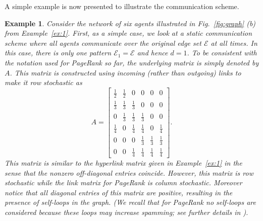 \documentclass[11pt,draftcls,onecolumn]{IEEEtran}
\newtheorem{example}[theorem]{Example}
\begin{document}
\vspace{.5cm}

A simple example is now presented to illustrate the communication scheme. 

\begin{example}\label{ex:consensus}\rm
Consider the network of six agents illustrated in Fig.~\ref{fig:graph} (b) from Example~\ref{ex:1}. 
First, as a simple case, we look at a static communication scheme
where all agents communicate over the original edge set $\mathcal{E}$ at all times.
In this case, there is only one pattern $\mathcal{E}_1 = \mathcal{E}$ and hence $d=1$. 
To be consistent with the notation used for PageRank so far, 
the underlying matrix is simply denoted by $A$. This matrix is constructed 
using incoming (rather than outgoing) links to make it row stochastic as
\[
 A = \begin{bmatrix}
       \frac{1}{2} & \frac{1}{2} & 0           & 0           & 0           & 0           \\
       \frac{1}{3} & \frac{1}{3} & \frac{1}{3} & 0           & 0           & 0           \\
       0           & \frac{1}{3} & \frac{1}{3} & \frac{1}{3} & 0           & 0           \\
       \frac{1}{4} & 0           & \frac{1}{4} & \frac{1}{4} & 0           & \frac{1}{4} \\
       0           & 0           & 0           & \frac{1}{3} & \frac{1}{3} & \frac{1}{3} \\
       0           & 0           & \frac{1}{4} & \frac{1}{4} & \frac{1}{4} & \frac{1}{4} 
     \end{bmatrix}.
\]
This matrix is similar to the hyperlink matrix given in Example~\ref{ex:1} in the sense
that the nonzero off-diagonal entries coincide. However, this matrix is row stochastic
while the link matrix for PageRank is column stochastic.
Moreover notice that all diagonal entries of this matrix are positive,
resulting in the presence of self-loops in the graph.
(We recall that for PageRank no self-loops are considered 
because these loops may increase spamming; 
see further details in \cite{LanMey:06,AndBorHop:07}).



\end{example}
\end{document}
